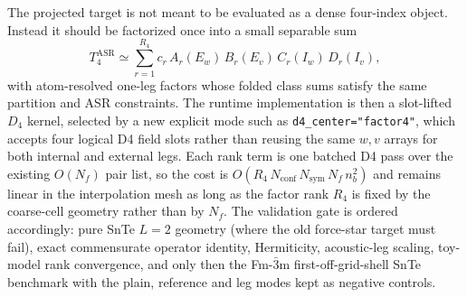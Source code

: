 \documentclass[11pt,a4paper]{article}
\begin{document}
The projected target is not meant to be evaluated as a dense four-index
object.  Instead it should be factorized once into a small separable sum
\begin{equation}
T_4^{\mathrm{ASR}} \simeq \sum_{r=1}^{R_4} c_r\,
A_r(E_w)\,B_r(E_v)\,C_r(I_w)\,D_r(I_v),
\label{eq:d4factor}
\end{equation}
with atom-resolved one-leg factors whose folded class sums satisfy the same
partition and ASR constraints.  The runtime implementation is then a
slot-lifted $D_4$ kernel, selected by a new explicit mode such as
\texttt{d4\_center="factor4"}, which accepts four logical D4 field slots
rather than reusing the same $w,v$ arrays for both internal and external
legs.  Each rank term is one batched D4 pass over the existing $O(N_f)$
pair list, so the cost is
$O(R_4\,N_{\mathrm{conf}}\,N_{\mathrm{sym}}\,N_f\,n_b^2)$ and remains
linear in the interpolation mesh as long as the factor rank $R_4$ is fixed
by the coarse-cell geometry rather than by $N_f$.  The validation gate is
ordered accordingly: pure SnTe $L=2$ geometry (where the old force-star
target must fail), exact commensurate operator identity, Hermiticity,
acoustic-leg scaling, toy-model rank convergence, and only then the
Fm-$\bar 3$m first-off-grid-shell SnTe benchmark with the plain,
reference and leg modes kept as negative controls.
\end{document}
